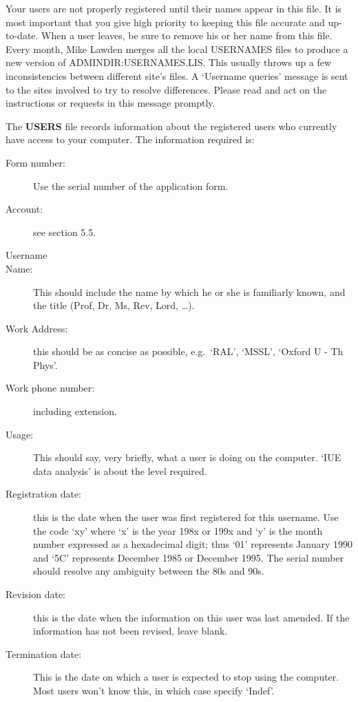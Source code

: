 Your users are not properly registered until their names appear in this file.
It is most important that you give high priority to keeping this file accurate
and up-to-date.
When a user leaves, be sure to remove his or her name from this file.
Every month, Mike Lawden merges all the local USERNAMES files to produce a
new version of ADMINDIR:\-USERNAMES.\-LIS.
This usually throws up a few inconsistencies between different site's files.
A `Username queries' message is sent to the sites involved to try to resolve
differences.
Please read and act on the instructions or requests in this message promptly.

The {\bf USERS} file records information about the registered users who
currently have access to your computer.
The information required is:
\begin{description}
\begin{description}
\item [Form number:] Use the serial number of the application form.
\item [Account:] see section 5.5.
\item [Username]
\item [Name:] This should include the name by which he or she is familiarly
known, and the title (Prof, Dr, Ms, Rev, Lord, \ldots).
\item [Work Address:] this should be as concise as possible, e.g.\ `RAL',
`MSSL', `Oxford U - Th Phys'.
\item [Work phone number:] including extension.
\item [Usage:] This should say, very briefly, what a user is doing on the
computer.
`IUE data analysis' is about the level required.
\item [Registration date:] this is the date when the user was first registered
for this username.
Use the code `xy' where `x' is the year 198x or 199x and `y' is the month number
expressed as a hexadecimal digit; thus `01' represents January 1990 and `5C'
represents December 1985 or December 1995.
The serial number should resolve any ambiguity between the 80s and 90s.
\item [Revision date:] this is the date when the information on this user was
last amended.
If the information has not been revised, leave blank.
\item [Termination date:] This is the date on which a user is expected to stop
using the computer.
Most users won't know this, in which case specify `Indef'.
\end{description}
\end{description}
